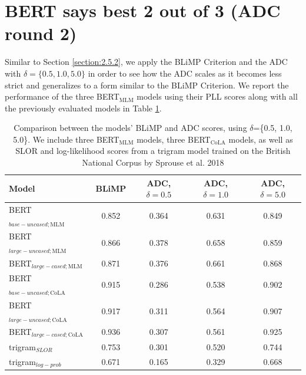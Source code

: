 \section{BERT says best 2 out of 3 (ADC round 2)}
Similar to Section \ref{section:2.5.2}, we apply the BLiMP Criterion and the ADC with $\delta=\{0.5, 1.0, 5.0\}$ in order to see how the ADC scales as it becomes less strict and generalizes to a form similar to the BLiMP Criterion.  We report the performance of the three BERT$_{\mathrm{MLM}}$ models using their PLL scores along with all the previously evaluated models in Table \ref{tab:table_15}.
\begin{table}[h]
    \centering
    \begin{tabular}{@{}lcccc@{}}
    \toprule
    \textbf{Model} & \textbf{BLiMP} & \textbf{ADC, $\delta=0.5$} & \textbf{ADC, $\delta=1.0$} & \textbf{ADC, $\delta=5.0$}  \\
    \midrule
    BERT$_{base-uncased; \mathrm{MLM}}$ & 0.852 & 0.364 & 0.631 & 0.849 \\
    BERT$_{large-uncased; \mathrm{MLM}}$ & 0.866 & 0.378 & 0.658 & 0.859 \\
    BERT$_{large-cased; \mathrm{MLM}}$ & 0.871 & 0.376 & 0.661 & 0.868 \\
    \midrule
    BERT$_{base-uncased; \mathrm{CoLA}}$ & 0.915 & 0.286 & 0.538 & 0.902 \\
    BERT$_{large-uncased; \mathrm{CoLA}}$ & 0.917 & 0.311 & 0.564 & 0.907 \\
    BERT$_{large-cased; \mathrm{CoLA}}$ & 0.936 & 0.307 & 0.561 & 0.925 \\
    \midrule
    trigram$_{SLOR}$ & 0.753 & 0.301 & 0.520 & 0.744\\
    trigram$_{log-prob}$ & 0.671 & 0.165 & 0.329 & 0.668 \\
    \bottomrule
    \end{tabular}
    \caption[BERT$_{\mathrm{MLM}}$, BERT$_{\mathrm{CoLA}}$, and trigram model scores\newline under BLiMP \& ADC]{Comparison between the models' BLiMP and ADC scores, using $\delta$=\{0.5, 1.0, 5.0\}. We include three BERT$_{\mathrm{MLM}}$ models, three BERT$_{\mathrm{CoLA}}$ models, as well as SLOR and log-likelihood scores from a trigram model trained on the British National Corpus by Sprouse et al. 2018}
    \label{tab:table_15}
\end{table}

